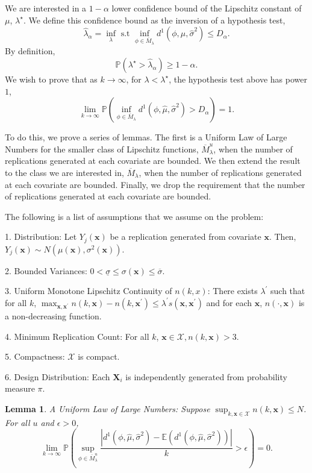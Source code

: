 \documentclass[10pt,a4paper]{amsart}
\newcommand{\spa}[1]{\text{{$\mathcal{#1}$}}}
\newcommand{\vect}[1]{\ensuremath{\bm{#1}}}
\newcommand{\desCap}{\ensuremath{\bm{X}}}
\newtheorem{lemma}{Lemma}
\begin{document}
We are interested in a $1-\alpha$ lower confidence bound of the Lipschitz constant of $\mu$, $\lambda^\star$. We define this confidence bound as the inversion of a hypothesis test,
$$\hat{\lambda}_\alpha=\inf_{\lambda} \text{ s.t } \inf_{\phi \in \overline{M}_\lambda} d^1(\phi,\hat{\mu},\hat{\sigma}^2) \leq D_\alpha.$$
By definition,
$$\mathbb{P}\left (\lambda^\star>\hat{\lambda}_\alpha \right )\geq 1-\alpha.$$
We wish to prove that as $k \to \infty$, for $\lambda<\lambda^\star$, the hypothesis test above has power $1$,
$$\lim_{k \to \infty} \mathbb{P}\left (\inf_{\phi \in \overline{M}_\lambda} d^1(\phi,\hat{\mu},\hat{\sigma}^2)>D_\alpha \right )=1.$$

To do this, we prove a series of lemmas. The first is a Uniform Law of Large Numbers for the smaller class of Lipschitz functions, $\overline{M}_\lambda^u$, when the number of replications generated at each covariate are bounded. We then extend the result to the class we are interested in, $\overline{M}_\lambda$, when the number of replications generated at each covariate are bounded. Finally, we drop the requirement that the number of replications generated at each covariate are bounded.

The following is a list of assumptions that we assume on the problem:

1. Distribution: Let $Y_j(\vect{x})$ be a replication generated from covariate $\vect{x}$. Then, $Y_j(\vect{x})\sim N(\mu(\vect{x}),\sigma^2(\vect{x}))$. 

2. Bounded Variances: $0<\underline{\sigma}\leq \sigma(\vect{x})\leq \overline{\sigma}$.

3. Uniform Monotone Lipschitz Continuity of $n(k,x)$: There exists $\lambda^\prime$ such that for all $k$, $\max_{\vect{x},\vect{x}^\prime}n(k,\vect{x})-n(k,\vect{x}^\prime)\leq \lambda^\prime s(\vect{x},\vect{x}^\prime)$ and for each $\vect{x}$, $n(\cdot,\vect{x})$ is a non-decreasing function.

4. Minimum Replication Count: For all $k$, $\vect{x} \in \spa{X}, n(k,\vect{x})>3$.

5. Compactness: $\spa{X}$ is compact.

6. Design Distribution: Each $\desCap_i$ is independently generated from probability measure $\pi$.


\begin{lemma}
\label{lemma: ulln}
 A Uniform Law of Large Numbers: Suppose $\sup_{k,\vect{x} \in \spa{X}} n(k,\vect{x}) \leq N$. For all $u$ and $\epsilon>0$,
 $$\lim_{k \to \infty}\mathbb{P}\left (\sup_{\phi \in \overline{M}^u_\lambda}\frac{|d^1(\phi,\hat{\mu},\hat{\sigma}^2)-\mathbb{E}\left ( d^1(\phi,\hat{\mu},\hat{\sigma}^2)\right )|}{k}>\epsilon\right )=0.$$
\end{lemma}
\end{document}
